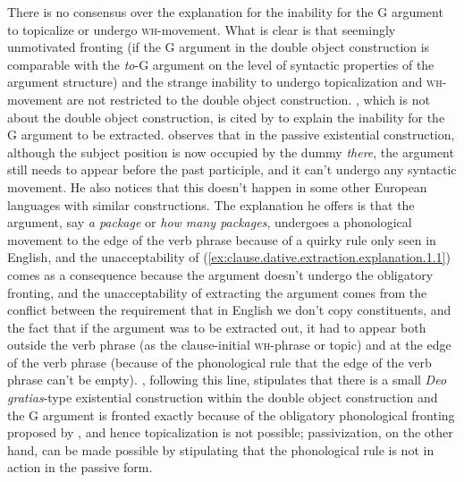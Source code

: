 \documentclass[UTF8, a4paper, oneside, scheme=plain, 12pt]{ctexbook}
\newcommand{\form}[1]{\emph{#1}}
\newcommand{\category}[1]{\textsc{#1}}
\begin{document}
There is no consensus over the explanation for the inability for the G argument 
to topicalize or undergo \category{wh}-movement.
What is clear is that seemingly unmotivated fronting 
(if the G argument in the double object construction 
is comparable with the \form{to}-G argument on the level of syntactic properties of the argument structure) 
and the strange inability to undergo topicalization and \category{wh}-movement 
are not restricted to the double object construction.
\citet{chomsky2001}, which is not about the double object construction, is cited by \citet{oba2005double} 
to explain the inability for the G argument to be extracted.
\citet{chomsky2001} observes that in the passive existential construction,
although the subject position is now occupied by the dummy \form{there}, 
the argument still needs to appear before the past participle, 
and it can't undergo any syntactic movement.
He also notices that this doesn't happen in some other European languages with similar constructions.
The explanation he offers is that the argument, say \form{a package} or \form{how many packages},
undergoes a phonological movement to the edge of the verb phrase 
because of a quirky rule only seen in English,
and the unacceptability of (\ref{ex:clause.dative.extraction.explanation.1.1}) comes as a consequence
because the argument doesn't undergo the obligatory fronting,
and the unacceptability of extracting the argument comes from the conflict 
between the requirement that 
in English we don't copy constituents,
and the fact that if the argument was to be extracted out, 
it had to appear both outside the verb phrase (as the clause-initial \category{wh}-phrase or topic)
and at the edge of the verb phrase 
(because of the phonological rule that the edge of the verb phrase can't be empty).
\citet{oba2005double}, following this line,
stipulates that there is a small \form{Deo gratias}-type existential construction 
within the double object construction
and the G argument is fronted exactly because of the obligatory phonological fronting 
proposed by \citet{chomsky2001},
and hence topicalization is not possible;
passivization, on the other hand, can be made possible
by stipulating that the phonological rule is not in action in the passive form. 
\end{document}
